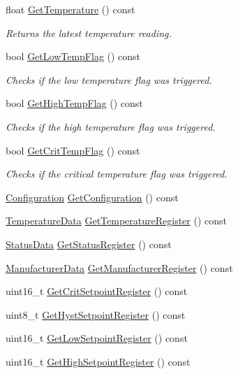 \begin{DoxyCompactItemize}
float \hyperlink{classcubesat_1_1ADT7311_ae9d908dd010582e8c1fe6b56826bbcbc}{Get\+Temperature} () const
\begin{DoxyCompactList}\small\item\em Returns the latest temperature reading. \end{DoxyCompactList}\item 
bool \hyperlink{classcubesat_1_1ADT7311_aa72c15f502541eb8fbfff33b77a27423}{Get\+Low\+Temp\+Flag} () const
\begin{DoxyCompactList}\small\item\em Checks if the low temperature flag was triggered. \end{DoxyCompactList}\item 
bool \hyperlink{classcubesat_1_1ADT7311_a7c4ec1475995dd4461ad8813eeebc384}{Get\+High\+Temp\+Flag} () const
\begin{DoxyCompactList}\small\item\em Checks if the high temperature flag was triggered. \end{DoxyCompactList}\item 
bool \hyperlink{classcubesat_1_1ADT7311_ad82d5473a3f07b5cb85cc4af670bba28}{Get\+Crit\+Temp\+Flag} () const
\begin{DoxyCompactList}\small\item\em Checks if the critical temperature flag was triggered. \end{DoxyCompactList}\item 
\hyperlink{unioncubesat_1_1ADT7311_1_1Configuration}{Configuration} \hyperlink{classcubesat_1_1ADT7311_af51b8fd845ccdabb5be82263025de820}{Get\+Configuration} () const
\item 
\hyperlink{unioncubesat_1_1ADT7311_1_1TemperatureData}{Temperature\+Data} \hyperlink{classcubesat_1_1ADT7311_a84b567fb73e84dca956b9129a020f7ed}{Get\+Temperature\+Register} () const
\item 
\hyperlink{unioncubesat_1_1ADT7311_1_1StatusData}{Status\+Data} \hyperlink{classcubesat_1_1ADT7311_abb9e10d67c752e460f50c964cae84661}{Get\+Status\+Register} () const
\item 
\hyperlink{unioncubesat_1_1ADT7311_1_1ManufacturerData}{Manufacturer\+Data} \hyperlink{classcubesat_1_1ADT7311_a7bee01cf24697f23b6e6ec236fab7966}{Get\+Manufacturer\+Register} () const
\item 
uint16\+\_\+t \hyperlink{classcubesat_1_1ADT7311_a504905f3649b3013f3f2d1ffe3676376}{Get\+Crit\+Setpoint\+Register} () const
\item 
uint8\+\_\+t \hyperlink{classcubesat_1_1ADT7311_a8b2cf374d18a6bc05a8529a4e667face}{Get\+Hyst\+Setpoint\+Register} () const
\item 
uint16\+\_\+t \hyperlink{classcubesat_1_1ADT7311_a1cc3625e29758f775de262aaea89b0f1}{Get\+Low\+Setpoint\+Register} () const
\item 
uint16\+\_\+t \hyperlink{classcubesat_1_1ADT7311_a97830a383f0149caf364a5e135d75835}{Get\+High\+Setpoint\+Register} () const
\end{DoxyCompactItemize}
